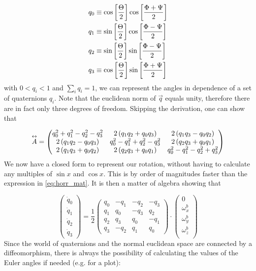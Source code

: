 \begin{align}
q_0 &\equiv \text{cos}\left[\frac{\Theta}{2}\right]  \text{cos}\left[\frac{\Phi+\Psi}{2}\right] \\
q_1 &\equiv \text{sin}\left[\frac{\Theta}{2}\right]  \text{cos}\left[\frac{\Phi-\Psi}{2}\right] \\
q_2 &\equiv \text{sin}\left[\frac{\Theta}{2}\right]  \text{sin}\left[\frac{\Phi-\Psi}{2}\right] \\
q_3 &\equiv \text{cos}\left[\frac{\Theta}{2}\right]  \text{sin}\left[\frac{\Phi+\Psi}{2}\right] 
\label{eq:quaternions}
\end{align}
with $0<q_i<1$ and $\sum_i q_i =1$, we can represent the angles in dependence of a set of quaternions $q_i$. Note that the euclidean norm of $\vec{q}$ equals unity, therefore there are in fact only three degrees of freedom. Skipping the derivation, one can show that


$$
\overset{\leftrightarrow}{A}= 
\begin{pmatrix}
 q_0^2 + q_1^2 -q_2^2 -q_3^2  & 2\left(q_1q_2+q_0q_3\right)  & 2\left(q_1q_3-q_0q_2\right) \\
 2\left(q_1q_2-q_0q_3\right)  & q_0^2 -q_1^2 +q_2^2 -q_3^2 &  2\left(q_2q_3+q_0q_1\right) \\
  2\left(q_1q_3+q_0q_2\right) &  2\left(q_2q_3+q_0q_1\right)  & q_0^2 -q_1^2 -q_2^2 +q_3^2
\end{pmatrix} 
$$
We now have a closed form to represent our rotation, without having to calculate any multiples of $\sin{x}$ and $\cos{x}$. This is by order of magnitudes faster than the expression in \eqref{eq:horr_mat}. It is then a matter of algebra showing that


$$
\begin{pmatrix}
 \dot{q}_0\\
 \dot{q}_1\\
  \dot{q}_2\\
   \dot{q}_3
   \end{pmatrix} 
= \frac{1}{2}
\begin{pmatrix}
 q_0 & - q_1 &  -q_2 & -q_3 \\
 q_1 &   q_0 &  -q_3 &  q_2 \\
 q_2 &   q_3 &   q_0 & -q_1 \\
 q_3 & - q_2 &   q_1 &  q_0 
\end{pmatrix} 
\cdot
\begin{pmatrix}
 0\\
\omega^b_x\\
\omega^b_y\\
\omega^b_z\\
   \end{pmatrix} 
$$
Since the world of quaternions and the normal euclidean space are connected by a diffeomorphism, there is always the possibility of calculating the values of the Euler angles if needed (e.g. for a plot):

